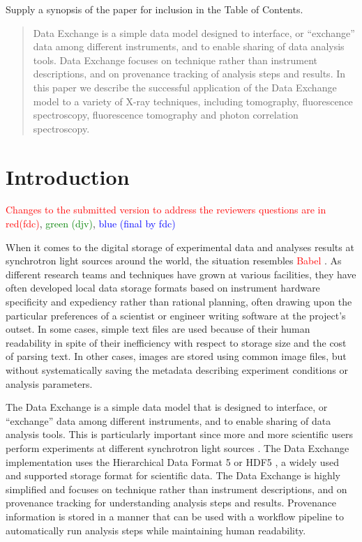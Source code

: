 \documentclass[pdf]{iucr}              %
\begin{document}

\maketitle                        %

\begin{synopsis}
Supply a synopsis of the paper for inclusion in the Table of Contents.
\end{synopsis}

\begin{abstract}
Data Exchange is a simple data model designed to interface, or ``exchange'' data among different instruments, and to enable sharing of data analysis tools. Data Exchange focuses on technique rather than instrument descriptions, and on provenance tracking of analysis steps and results. In this paper we describe the successful application of the Data Exchange model to a variety of X-ray techniques, including tomography, fluorescence spectroscopy, fluorescence tomography and photon correlation spectroscopy.
\end{abstract}


\section{Introduction}


\textcolor{red}{Changes to the submitted version to address the reviewers questions are in red(fdc)}, \textcolor{green}{green (djv)}, \textcolor{blue}{blue (final by fdc)}

When it comes to the digital storage of experimental data and analyses results at synchrotron light sources around the world, the situation resembles \textcolor{red}{Babel \cite{genesis}}. As different research teams and techniques have grown at various facilities, they have often developed local data storage formats based on instrument hardware specificity and expediency rather than rational planning, often drawing upon the particular preferences of a scientist or engineer writing software at the project's outset. In some cases, simple text files are used because of their human readability in spite of their inefficiency with respect to storage size and the cost of parsing text. In other cases, images are stored using common image files, but without systematically saving the metadata describing experiment conditions or analysis parameters.

The Data Exchange is a simple data model that is designed to interface, or ``exchange'' data among different instruments, and to enable sharing of data analysis tools. This is particularly important since more and more scientific users perform experiments at different synchrotron light sources \cite{Kanitpanyacharoen}. The Data Exchange implementation uses the Hierarchical Data Format 5 or HDF5 \cite{HDF5}, a widely used and supported storage format for scientific data. The Data Exchange is highly simplified and focuses on technique rather than instrument descriptions, and on provenance tracking for understanding analysis steps and results. Provenance information is stored in a manner that can be used with a workflow pipeline to automatically run analysis steps while maintaining human readability.
\end{document}

